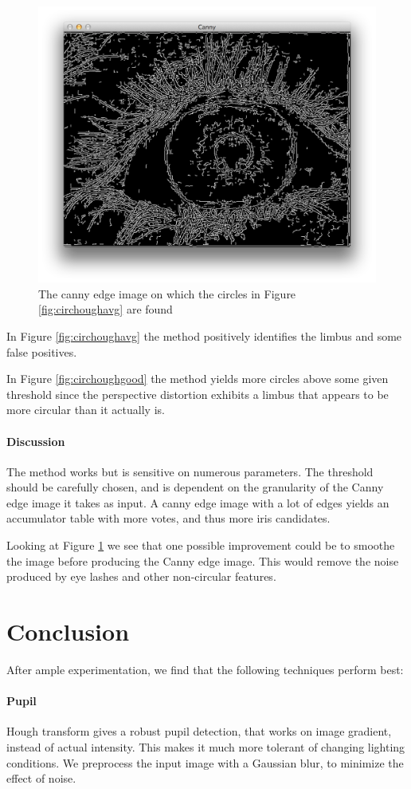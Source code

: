 \documentclass[a4paper,11pt]{article}
\begin{document}
\begin{figure}[H]
\centering
  \includegraphics[width=.8\linewidth]{houghcanny}
  \caption{The canny edge image on which the circles in Figure \ref{fig:circhoughavg} are found}
  \label{fig:canny}
\end{figure}
In Figure \ref{fig:circhoughavg} the method positively identifies the limbus and some false positives.

In Figure \ref{fig:circhoughgood} the method yields more circles above some given threshold since the perspective distortion exhibits a limbus that appears to be more circular than it actually is.

\paragraph{Discussion} %
\label{par:discussion}
The method works but is sensitive on numerous parameters. The threshold should be carefully chosen, and is dependent on the granularity of the Canny edge image it takes as input. A canny edge image with a lot of edges yields an accumulator table with more votes, and thus more iris candidates.

Looking at Figure \ref{fig:canny} we see that one possible improvement could be to smoothe the image before producing the Canny edge image. This would remove the noise produced by eye lashes and other non-circular features.

\section{Conclusion}
After ample experimentation, we find that the following techniques perform best:
\paragraph{Pupil}
Hough transform gives a robust pupil detection, that works on image gradient, instead of actual intensity. This makes it much more tolerant of changing lighting conditions. We preprocess the input image with a Gaussian blur, to minimize the effect of noise.
\end{document}
